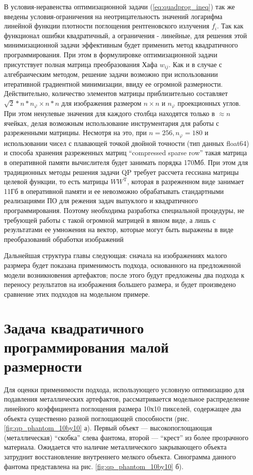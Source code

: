 В условия-неравенства оптимизационной задачи (\ref{eq:quadprog_ineq}) так же введены условия-ограничения на неотрицательность значений логарифма линейной функции плотности поглощения рентгеновского излучения $f_i$.
Так как функционал ошибки квадратичный, а ограничения - линейные, для решения этой минимизационной задачи эффективным будет применить метод квадратичного программирования.
При этом в формулировке оптимизационной задачи присутствует полная матрица преобразования Хафа $w_{ij}$.
Как и в случае с алгебраическим методом, решение задачи возможно при использовании итеративной градиентной минимизации, ввиду ее огромной размерности.
Действительно, количество элементов матрицы приблизительно составляет $\sqrt{2} * n * n_\varphi \times n * n$ для изображения размером $n \times n$ и $n_\varphi$ проекционных углов.
При этом ненулевые значения для каждого столбца находятся только в $\approx n$ ячейках, делая возможным использование инструментария для работы с разреженными матрициы.
Несмотря на это, при $n = 256, n_\varphi = 180$ и использовании чисел с плавающей точкой двойной точности (тип данных float64) и способа хранения разреженных матриц ``compressed sparse row'' такая матрица в оперативной памяти вычислителя будет занимать порядка 170Мб.
При этом для традиционных методы решения задачи QP требует рассчета гессиана матрицы целевой функции, то есть матрицы $W W^{\mathrm{T}}$, которая в разреженном виде занимает 11Гб в оперативной памяти и ее невозможно обрабатывать стандартными реализациями ПО для режения задач выпуклого и квадратичного программирования.
Поэтому необходима разработка специальной процедуры, не требующей работы с такой огромной матрицей в явном виде, а лишь с результатами ее умножения на вектор, которые могут быть выражены в виде преобразований обработки изображений

Дальнейшая структура главы следующая: сначала на изображениях малого разрмера будет показана применимость подхода, основанного на предложенной модели возникновения артефактов; после этого будут предложены два подхода к переносу результатов на изображения большего размера, и будет произведено сравнение этих подходов на модельном примере.

\section{Задача квадратичного программирования малой размерности}
\label{sect_2_1}

Для оценки применимости подхода, использующего условную оптимизацию для подавления металлических артефактов, рассматривается модельное распределение линейного коэффициента поглощения размера 10х10 пикселей, содержащее два объекта существенно разной поглощающей способности (рис. \ref{fig:qp_phantom_10by10} а).
Первый объект --- высокопоглощающая (металлическая) ``скобка'' слева фантома, второй --- ``крест'' из более прозрачного материала.
Ожидается что наличие металлического закрывающего объекта затруднит восстановление внутреннего мелкого объекта.
Синограмма данного фантома представлена на рис. \ref{fig:qp_phantom_10by10} б).

